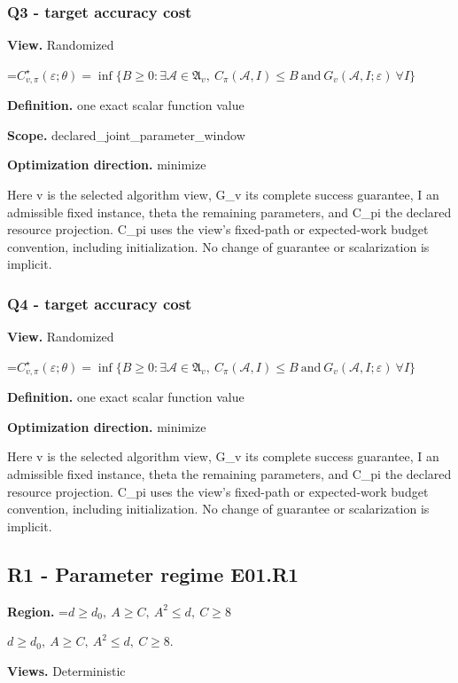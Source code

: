 \documentclass[10pt,a4paper]{article}
\newcommand{\AtlasMath}[1]{\par\begingroup\centering\setbox0=\hbox{$\displaystyle #1$}\ifdim\wd0>1.4\linewidth\typeout{ATLAS WIDE FORMULA: \the\wd0}\fi\ifdim\wd0>\linewidth\resizebox{\linewidth}{!}{\box0}\else\box0\fi\par\endgroup}
\newcommand{\AtlasInlineMath}[1]{\begingroup\setbox0=\hbox{$#1$}\ifdim\wd0>.4\linewidth\endgroup\AtlasMath{#1}\else\endgroup$#1$\fi}
\begin{document}
\subsubsection{Q3 - target accuracy cost}
\textbf{View.} Randomized

\AtlasMath{C^\star_{v,\pi}(\varepsilon;\theta)=\inf\{B\ge0:\exists\mathcal A\in\mathfrak A_v,\ C_\pi(\mathcal A,I)\le B\ \text{and}\ G_v(\mathcal A,I;\varepsilon)\ \forall I\}}
\textbf{Definition.} one exact scalar function value

\textbf{Scope.} declared\_\allowbreak{}joint\_\allowbreak{}parameter\_\allowbreak{}window

\textbf{Optimization direction.} minimize

Here v is the selected algorithm view, G\_\allowbreak{}v its complete success guarantee, I an admissible fixed instance, theta the remaining parameters, and C\_\allowbreak{}pi the declared resource projection. C\_\allowbreak{}pi uses the view's fixed-path or expected-work budget convention, including initialization. No change of guarantee or scalarization is implicit.

\subsubsection{Q4 - target accuracy cost}
\textbf{View.} Randomized

\AtlasMath{C^\star_{v,\pi}(\varepsilon;\theta)=\inf\{B\ge0:\exists\mathcal A\in\mathfrak A_v,\ C_\pi(\mathcal A,I)\le B\ \text{and}\ G_v(\mathcal A,I;\varepsilon)\ \forall I\}}
\textbf{Definition.} one exact scalar function value

\textbf{Optimization direction.} minimize

Here v is the selected algorithm view, G\_\allowbreak{}v its complete success guarantee, I an admissible fixed instance, theta the remaining parameters, and C\_\allowbreak{}pi the declared resource projection. C\_\allowbreak{}pi uses the view's fixed-path or expected-work budget convention, including initialization. No change of guarantee or scalarization is implicit.

\subsection{R1 - Parameter regime E01.R1}
\textbf{Region.} \AtlasInlineMath{d\ge d_0,\ A\ge C,\ A^2\le d,\ C\ge8}.

\textbf{Views.} Deterministic
\end{document}
